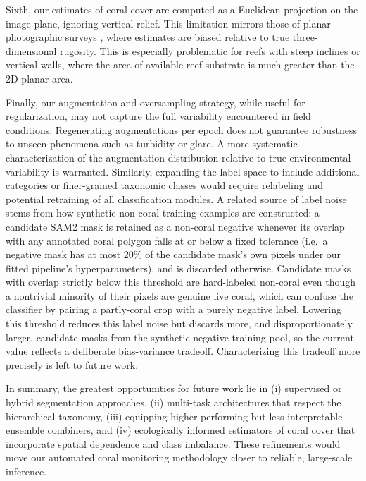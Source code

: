 \documentclass[11pt]{elsarticle}
\begin{document}
Sixth, our estimates of coral cover are computed as a Euclidean projection on the image plane, ignoring vertical relief. This limitation mirrors those of planar photographic surveys \citep{peerj954}, where estimates are biased relative to true three-dimensional rugosity. This is especially problematic for reefs with steep inclines or vertical walls, where the area of available reef substrate is much greater than the 2D planar area.  %

Finally, our augmentation and oversampling strategy, while useful for regularization, may not capture the full variability encountered in field conditions. Regenerating augmentations per epoch does not guarantee robustness to unseen phenomena such as turbidity or glare. A more systematic characterization of the augmentation distribution relative to true environmental variability is warranted. Similarly, expanding the label space to include additional categories or finer-grained taxonomic classes would require relabeling and potential retraining of all classification modules. A related source of label noise stems from how synthetic non-coral training examples are constructed: a candidate SAM2 mask is retained as a non-coral negative whenever its overlap with any annotated coral polygon falls at or below a fixed tolerance (i.e.\ a negative mask has at most 20\% of the candidate mask's own pixels under our fitted pipeline's hyperparameters), and is discarded otherwise. Candidate masks with overlap strictly below this threshold are hard-labeled non-coral even though a nontrivial minority of their pixels are genuine live coral, which can confuse the classifier by pairing a partly-coral crop with a purely negative label. Lowering this threshold reduces this label noise but discards more, and disproportionately larger, candidate masks from the synthetic-negative training pool, so the current value reflects a deliberate bias-variance tradeoff. Characterizing this tradeoff more precisely is left to future work.

In summary, the greatest opportunities for future work lie in (i) supervised or hybrid segmentation approaches, (ii) multi-task architectures that respect the hierarchical taxonomy, (iii) equipping higher-performing but less interpretable ensemble combiners, and (iv) ecologically informed estimators of coral cover that incorporate spatial dependence and class imbalance. These refinements would move our automated coral monitoring methodology closer to reliable, large-scale inference.
\end{document}
